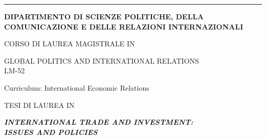 \begin{titlepage}
\pagestyle{empty}


\begin{center}

\vspace*{1cm}

\hrule

\vspace*{1.25cm}
 
\begin{large}
\textbf{DIPARTIMENTO DI SCIENZE POLITICHE, DELLA}\\
\textbf{COMUNICAZIONE E DELLE RELAZIONI INTERNAZIONALI}
\end{large}

\vspace*{1.7cm}  

\begin{large}
CORSO DI LAUREA MAGISTRALE IN
\end{large}

\vspace*{0.25cm}  

\begin{large}
GLOBAL POLITICS AND INTERNATIONAL RELATIONS\\
LM-52
\end{large}

\vspace*{0.35cm}  

\begin{large}
Curriculum: International Economic Relations
\end{large}

\vspace*{2cm}

\begin{large}
TESI DI LAUREA IN 	
\end{large}

\vspace*{0.25cm}  

\begin{Large}
\textbf{\textit{INTERNATIONAL TRADE AND INVESTMENT:}}\\
\textbf{\textit{ISSUES AND POLICIES}}
\end{Large}

\vspace*{2cm}

\begin{Large}
\title
\end{Large}


\end{center}
\end{titlepage}
